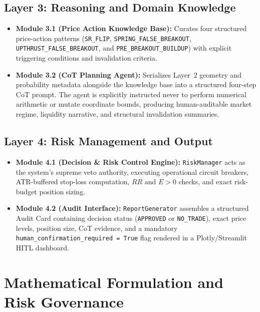 \documentclass[conference]{IEEEtran}
\begin{document}
\subsection{Layer 3: Reasoning and Domain Knowledge}
\begin{itemize}
    \item \textbf{Module 3.1 (Price Action Knowledge Base):} Curates four structured price-action patterns (\texttt{SR\_FLIP}, \texttt{SPRING\_FALSE\_BREAKOUT}, \texttt{UPTHRUST\_FALSE\_BREAKOUT}, and \texttt{PRE\_BREAKOUT\_BUILDUP}) with explicit triggering conditions and invalidation criteria.
    \item \textbf{Module 3.2 (CoT Planning Agent):} Serializes Layer~2 geometry and probability metadata alongside the knowledge base into a structured four-step CoT prompt. The agent is explicitly instructed never to perform numerical arithmetic or mutate coordinate bounds, producing human-auditable market regime, liquidity narrative, and structural invalidation summaries.
\end{itemize}

\subsection{Layer 4: Risk Management and Output}
\begin{itemize}
    \item \textbf{Module 4.1 (Decision \& Risk Control Engine):} \texttt{RiskManager} acts as the system's supreme veto authority, executing operational circuit breakers, ATR-buffered stop-loss computation, $RR$ and $E > 0$ checks, and exact risk-budget position sizing.
    \item \textbf{Module 4.2 (Audit Interface):} \texttt{ReportGenerator} assembles a structured Audit Card containing decision status (\texttt{APPROVED} or \texttt{NO\_TRADE}), exact price levels, position size, CoT evidence, and a mandatory \texttt{human\_confirmation\_required = True} flag rendered in a Plotly/Streamlit HITL dashboard.
\end{itemize}

\section{Mathematical Formulation and Risk Governance}
\end{document}
